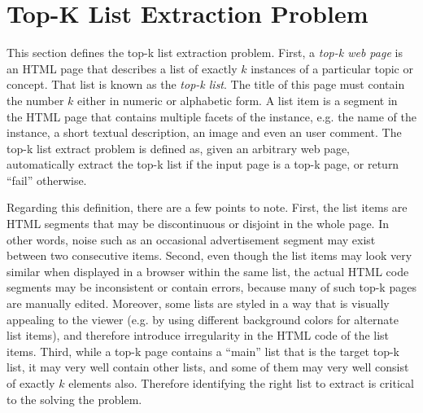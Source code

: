 \section{Top-K List Extraction Problem}
\label{sec:problem}
This section defines the top-k list extraction problem. 
First, a {\em top-k web page} is an HTML page that describes a list of
exactly $k$ instances of a particular topic or concept. 
That list is known as the {\em top-k list}.
The title of this page must contain the number $k$
either in numeric or alphabetic form. A list item is a segment in
the HTML page that contains multiple facets of the instance, e.g.
the name of the instance, a short textual description, an image and
even an user comment. The top-k list extract problem is defined as,
given an arbitrary web page, automatically extract the top-k list 
if the input page is a top-k page, or return ``fail'' otherwise.

Regarding this definition, there are a few points to note. First,
the list items are HTML segments that may be discontinuous or disjoint
in the whole page. In other words, noise such as an occasional advertisement
segment may exist between two consecutive items. 
Second, even though the list items may look
very similar when displayed in a browser within the same list, 
the actual HTML code segments may be
inconsistent or contain errors, because many of such top-k pages 
are manually edited. Moreover, some lists are styled in a way that is visually
appealing to the viewer (e.g. by using different background colors for
alternate list items), and therefore introduce irregularity in the
HTML code of the list items. Third, while a top-k page contains a ``main'' list
that is the target top-k list, it may very well contain other lists,
and some of them may very well consist of exactly $k$ elements also. 
Therefore identifying the right list to extract is critical to the solving
the problem. 


%
%
%
%
%
%
%
%
%
%
